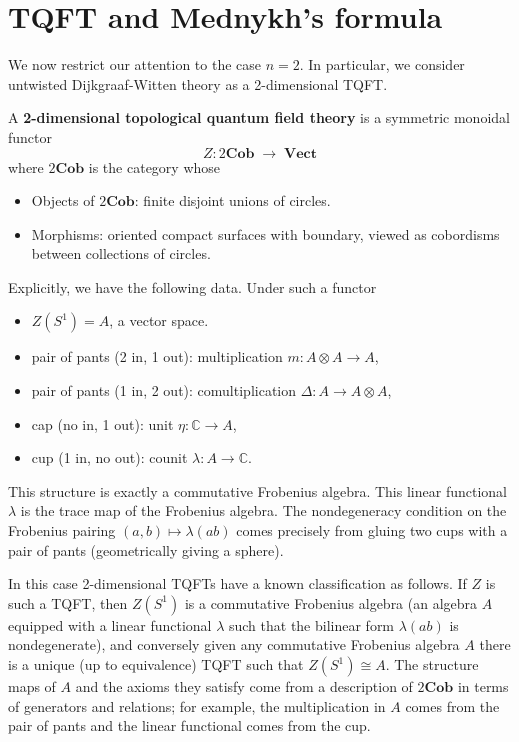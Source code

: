 \documentclass[12pt]{article}
\begin{document}
\section{TQFT and Mednykh's formula}
We now restrict our attention to the case $n=2$. In particular, we consider untwisted Dijkgraaf-Witten theory as a 2-dimensional TQFT.
\begin{definition}
A \textbf{2-dimensional topological quantum field theory} is a symmetric monoidal functor
\[Z:2\mathbf{Cob} \;\to\; \mathbf{Vect}\] where $2\mathbf{Cob}$ is the category whose
\begin{itemize}
    \item Objects of $2\mathbf{Cob}$: finite disjoint unions of circles.
    \item Morphisms: oriented compact surfaces with boundary, viewed as cobordisms between collections of circles.
\end{itemize}
\end{definition}
Explicitly, we have the following data. Under such a functor
\begin{itemize}
    \item $Z(S^1) = A$, a vector space.
    \item pair of pants (2 in, 1 out): multiplication $m:A\otimes A\to A$,
    \item pair of pants (1 in, 2 out): comultiplication $\Delta:A\to A\otimes A$,
    \item cap (no in, 1 out): unit $\eta:\mathbb{C}\to A$,
    \item cup (1 in, no out): counit $\lambda:A\to\mathbb{C}$.
\end{itemize}
This structure is exactly a commutative Frobenius algebra. This linear functional $\lambda$ is the trace map of the Frobenius algebra. The nondegeneracy condition on the Frobenius pairing $(a,b)\mapsto \lambda(ab)$ comes precisely from gluing two cups with a pair of pants (geometrically giving a sphere).

In this case 2-dimensional TQFTs have a known classification as follows. If $Z$ is such a TQFT, then $Z(S^1)$ is a commutative Frobenius algebra (an algebra $A$ equipped with a linear functional $\lambda$ such that the bilinear form $\lambda(ab)$ is nondegenerate), and conversely given any commutative Frobenius algebra $A$ there is a unique (up to equivalence) TQFT such that $Z(S^1)\cong A$. The structure maps of $A$ and the axioms they satisfy come from a description of $2\mathbf{Cob}$ in terms of generators and relations; for example, the multiplication in $A$ comes from the pair of pants and the linear functional comes from the cup.
\end{document}

